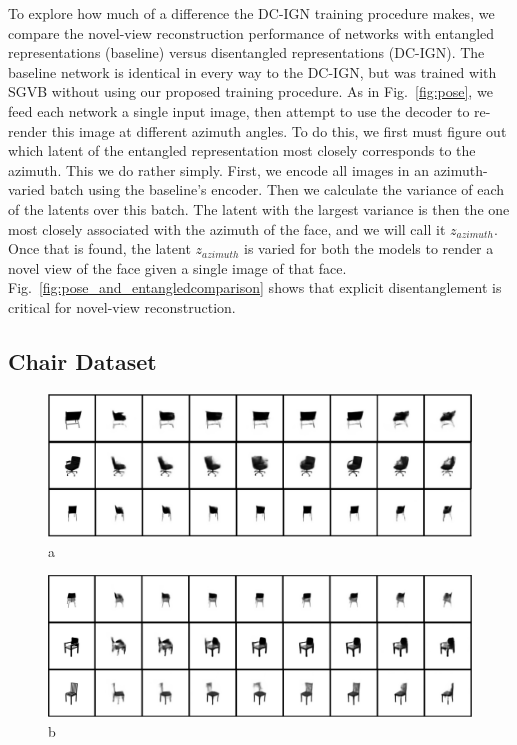 \documentclass[12pt,twoside]{mitthesis}
\begin{document}
To explore how much of a difference the DC-IGN training procedure makes,
we compare the novel-view reconstruction performance of networks with
entangled representations (baseline) versus disentangled representations
(DC-IGN). The baseline network is identical in every way to the DC-IGN,
but was trained with SGVB without using our proposed training procedure.
As in Fig.~\ref{fig:pose}, we feed each network a single input image,
then attempt to use the decoder to re-render this image at different
azimuth angles. To do this, we first must figure out which latent of the
entangled representation most closely corresponds to the azimuth. This
we do rather simply. First, we encode all images in an azimuth-varied
batch using the baseline's encoder. Then we calculate the variance of
each of the latents over this batch. The latent with the largest
variance is then the one most closely associated with the azimuth of the
face, and we will call it \(z_{azimuth}\). Once that is found, the
latent \(z_{azimuth}\) is varied for both the models to render a novel
view of the face given a single image of that face.
Fig.~\ref{fig:pose_and_entangledcomparison} shows that explicit
disentanglement is critical for novel-view reconstruction.

\subsection{Chair Dataset}\label{chair-dataset}

\hypertarget{fig:chairpose}{}
\begin{figure}[htbp]
\centering
\includegraphics{../figures/chairs_transforms_good.png}
\caption{a}
\end{figure}

\begin{figure}[htbp]
\centering
\includegraphics{../figures/chairs_transforms_bad.png}
\caption{b}
\end{figure}
\end{document}
